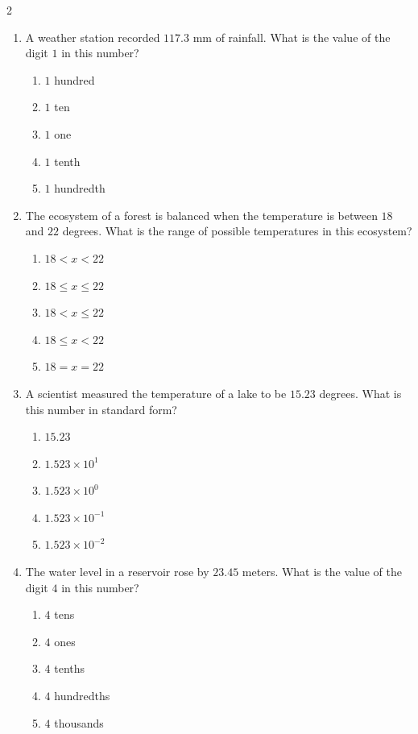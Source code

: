 \documentclass[10pt]{article}
\begin{document}
\begin{multicols}{2}
\begin{enumerate}[label=\textbf{Q\arabic*.}, leftmargin=*, itemsep=6pt, parsep=0pt]
  \item \small A weather station recorded $117.3$ mm of rainfall. What is the value of the digit $1$ in this number?
  \begin{enumerate}[label=(\Alph*), leftmargin=0.6cm, nosep, itemsep=2pt]
    \item $1$ hundred
    \item $1$ ten
    \item $1$ one
    \item $1$ tenth
    \item $1$ hundredth
  \end{enumerate}

  \item \small The ecosystem of a forest is balanced when the temperature is between $18$ and $22$ degrees. What is the range of possible temperatures in this ecosystem?
  \begin{enumerate}[label=(\Alph*), leftmargin=0.6cm, nosep, itemsep=2pt]
    \item $18 < x < 22$
    \item $18 \leq x \leq 22$
    \item $18 < x \leq 22$
    \item $18 \leq x < 22$
    \item $18 = x = 22$
  \end{enumerate}

  \item \small A scientist measured the temperature of a lake to be $15.23$ degrees. What is this number in standard form?
  \begin{enumerate}[label=(\Alph*), leftmargin=0.6cm, nosep, itemsep=2pt]
    \item $15.23$
    \item $1.523 \times 10^{1}$
    \item $1.523 \times 10^{0}$
    \item $1.523 \times 10^{-1}$
    \item $1.523 \times 10^{-2}$
  \end{enumerate}

  \item \small The water level in a reservoir rose by $23.45$ meters. What is the value of the digit $4$ in this number?
  \begin{enumerate}[label=(\Alph*), leftmargin=0.6cm, nosep, itemsep=2pt]
    \item $4$ tens
    \item $4$ ones
    \item $4$ tenths
    \item $4$ hundredths
    \item $4$ thousands
  \end{enumerate}


\end{enumerate}
\end{multicols}
\end{document}
